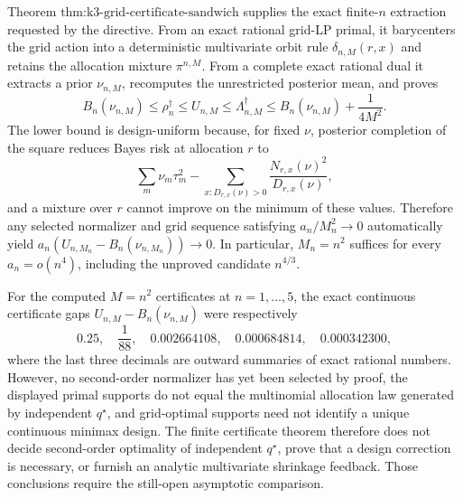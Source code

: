 Theorem \(\text{thm:k3-grid-certificate-sandwich}\) supplies the exact finite-\(n\) extraction requested by the directive.  From an exact rational grid-LP primal, it barycenters the grid action into a deterministic multivariate orbit rule \(\delta_{n,M}(r,x)\) and retains the allocation mixture \(\pi^{n,M}\).  From a complete exact rational dual it extracts a prior \(\nu_{n,M}\), recomputes the unrestricted posterior mean, and proves
\[
 B_n(\nu_{n,M})\leq\rho_n^\dagger\leq U_{n,M}
 \leq\Lambda_{n,M}^\dagger
 \leq B_n(\nu_{n,M})+\frac1{4M^2}.
\]
The lower bound is design-uniform because, for fixed \(\nu\), posterior completion of the square reduces Bayes risk at allocation \(r\) to
\[
 \sum_m\nu_m\tau_m^2-
 \sum_{x:D_{r,x}(\nu)>0}\frac{N_{r,x}(\nu)^2}{D_{r,x}(\nu)},
\]
and a mixture over \(r\) cannot improve on the minimum of these values.  Therefore any selected normalizer and grid sequence satisfying \(a_n/M_n^2\to0\) automatically yield \(a_n(U_{n,M_n}-B_n(\nu_{n,M_n}))\to0\).  In particular, \(M_n=n^2\) suffices for every \(a_n=o(n^4)\), including the unproved candidate \(n^{4/3}\).

For the computed \(M=n^2\) certificates at \(n=1,\ldots,5\), the exact continuous certificate gaps \(U_{n,M}-B_n(\nu_{n,M})\) were respectively
\[
 0.25,\quad \frac1{88},\quad 0.002664108,\quad
 0.000684814,\quad 0.000342300,
\]
where the last three decimals are outward summaries of exact rational numbers.  However, no second-order normalizer has yet been selected by proof, the displayed primal supports do not equal the multinomial allocation law generated by independent \(q^\star\), and grid-optimal supports need not identify a unique continuous minimax design.  The finite certificate theorem therefore does not decide second-order optimality of independent \(q^\star\), prove that a design correction is necessary, or furnish an analytic multivariate shrinkage feedback.  Those conclusions require the still-open asymptotic comparison.